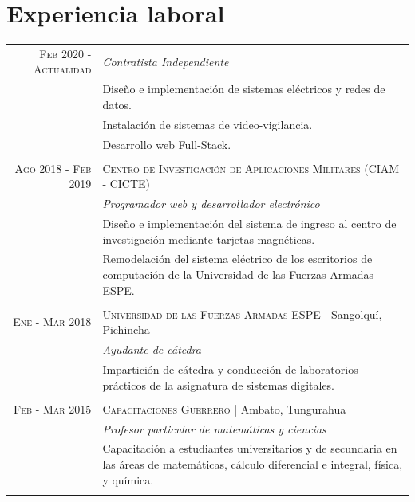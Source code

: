 \documentclass[a4paper,10.9pt]{article}
\begin{document}
\section{Experiencia laboral}
\begin{tabular}{r|p{11cm}}
\textsc{Feb 2020 - Actualidad} &\emph{Contratista Independiente}\\&\footnotesize{Diseño e implementación de sistemas eléctricos y redes de datos.}\\&\footnotesize{Instalación de sistemas de video-vigilancia.} \\&\footnotesize{Desarrollo web Full-Stack.}}\\
\multicolumn{2}{c}{} \\
\textsc{Ago 2018 - Feb 2019} &\textsc{Centro de Investigación de Aplicaciones Militares (CIAM - CICTE)} \\&\emph{Programador web y desarrollador electrónico}\\&\footnotesize{Diseño e implementación del sistema de ingreso al centro de investigación mediante tarjetas magnéticas.}\\&\footnotesize{Remodelación del sistema eléctrico de los escritorios de computación de la Universidad de las Fuerzas Armadas ESPE.}\\  
\multicolumn{2}{c}{} \\
 \textsc{Ene - Mar 2018} &\textsc{Universidad de las Fuerzas Armadas ESPE} | Sangolquí, Pichincha \\&\emph{Ayudante de cátedra}\\&\footnotesize{Impartición de cátedra y conducción de laboratorios prácticos de la asignatura de sistemas digitales.}\\ 
\multicolumn{2}{c}{} \\
 \textsc{Feb - Mar 2015}&\textsc{Capacitaciones Guerrero} | Ambato, Tungurahua \\&\emph{Profesor particular de matemáticas y ciencias}\\&\footnotesize{Capacitación a estudiantes universitarios y de secundaria en las áreas de matemáticas, cálculo diferencial e integral, física, y química.}\\ &
\end{tabular}
\end{document}

